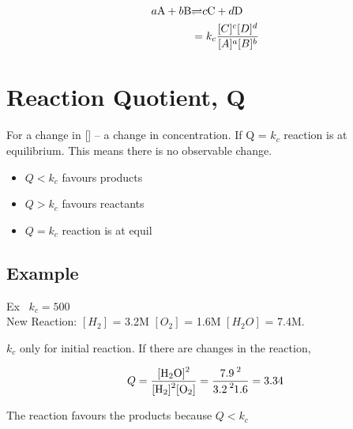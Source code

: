 \documentclass{article}
\begin{document}
\begin{align*}
a\ce{A} + b\ce{B} &\ce{\rightleftharpoons} c\ce{C} + d\ce{D}\\
&= k_{c}\frac{[C]^{c}[D]^{d}}{[A]^{a}[B]^{b}}
\end{align*}

\section{Reaction Quotient, Q}
For a change in [] -- a change in concentration. If Q = $k_{c}$ reaction is at equilibrium. This means there is no observable change.

\begin{itemize}
\item $Q<k_{c}$ favours products
\item $Q>k_{c}$ favours reactants
\item $Q=k_{c}$ reaction is at equil
\end{itemize}

\subsection{Example}
Ex \ $k_{c} = 500$\\New Reaction: $[H_{2}]$ = 3.2M $[O_{2}]$ = 1.6M $[H_{2}O]$ = 7.4M.

$k_{c}$ only for initial reaction. If there are changes in the reaction, 

$$ Q = \ce{\frac{[H2O]^{2}}{[H2]^{2}[O2]}} = \ce{\frac{7.9^{2}}{3.2^{2}{1.6}}} = 3.34$$

The reaction favours the products because $Q < k_{c}$


\end{document}
